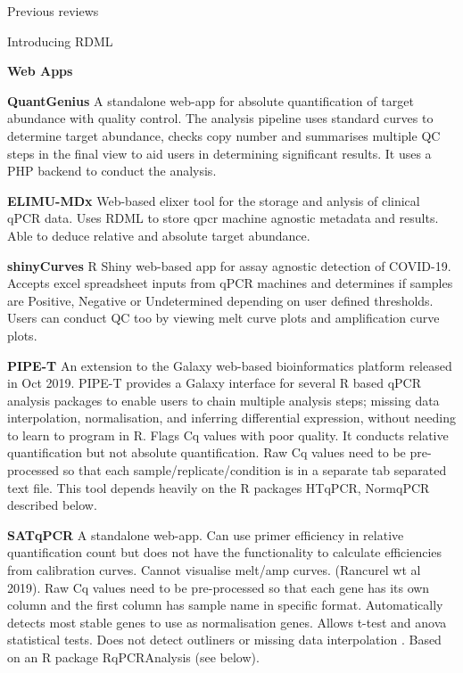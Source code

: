 \documentclass{SBCbookchapter}
\begin{document}
Previous reviews \cite{Rodiger2015, Pabinger2014}

Introducing RDML \cite{Rodiger2017}



\textbf{Web Apps}

\textbf{QuantGenius} A standalone web-app for absolute quantification of target abundance with quality control. The analysis pipeline uses standard curves to determine target abundance, checks copy number and summarises multiple QC steps in the final view to aid users in determining significant results. It uses a PHP backend to conduct the analysis.   \cite{Baebler2017}

\textbf{ELIMU-MDx} Web-based elixer tool for the storage and anlysis of clinical qPCR data. Uses RDML to store qpcr machine agnostic metadata and results. Able to deduce relative and absolute target abundance.  \cite{Krahenbuhl2019}

\textbf{shinyCurves} R Shiny web-based app for assay agnostic detection of COVID-19. Accepts excel spreadsheet inputs from qPCR machines and determines if samples are Positive, Negative or Undetermined depending on user defined thresholds. Users can conduct QC too by viewing melt curve plots and amplification curve plots. \cite{OlaecheaLazaro2021}

\textbf{PIPE-T} An extension to the Galaxy web-based bioinformatics platform released in Oct 2019. PIPE-T provides a Galaxy interface for several R based qPCR analysis packages to enable users to chain multiple analysis steps; missing data interpolation, normalisation, and inferring differential expression, without needing to learn to program in R. Flags Cq values with poor quality. It conducts relative quantification but not absolute quantification. Raw Cq values need to be pre-processed so that each sample/replicate/condition is in a separate tab separated text file.  This tool depends heavily on the R packages HTqPCR, NormqPCR described below. \cite{Zanardi2019}

\textbf{SATqPCR} A standalone web-app. Can use primer efficiency in relative quantification count but does not have the functionality to calculate efficiencies from calibration curves. Cannot visualise melt/amp curves. (Rancurel wt al 2019). Raw Cq values need to be pre-processed so that each gene has its own column and the first column has sample name in specific format. Automatically detects most stable genes to use as normalisation genes. Allows t-test and anova statistical tests. Does not detect outliners or missing data interpolation \cite{Rancurel2019}. Based on an R package RqPCRAnalysis (see below).
\end{document}
